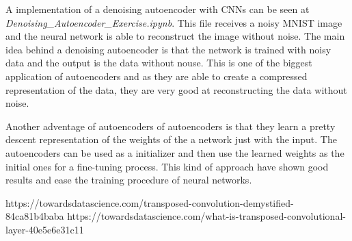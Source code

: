 \documentclass{article}
\begin{document}
A implementation of a denoising autoencoder with CNNs can be seen at \textit{Denoising\_Autoencoder\_Exercise.ipynb}. This file receives a noisy MNIST image and the neural network is able to reconstruct the image without noise. The main idea behind a denoising autoencoder is that the network is trained with noisy data and the output is the data without nouse. This is one of the biggest application of autoencoders and as they are able to create a compressed representation of the data, they are very good at reconstructing the data without noise.

Another adventage of autoencoders of autoencoders is that they learn a pretty descent representation of the weights of the a network just with the input. The autoencoders can be used as a initializer and then use the learned weights as the initial ones for a fine-tuning process. This kind of approach have shown good results and ease the training procedure of neural networks.

https://towardsdatascience.com/transposed-convolution-demystified-84ca81b4baba
https://towardsdatascience.com/what-is-transposed-convolutional-layer-40e5e6e31c11

\printbibliography
\end{document}
